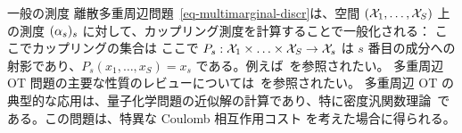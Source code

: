 \begin{rem2}{一般の測度}
離散多重周辺問題~\eqref{eq-multimarginal-discr}は、空間 $(\mathcal{X}_1,\ldots,\mathcal{X}_S)$ 上の測度 $(\alpha_s)_s$ に対して、カップリング測度を計算することで一般化される：
ここでカップリングの集合は
ここで $P_s : \mathcal{X}_1 \times \ldots \times \mathcal{X}_S \rightarrow \mathcal{X}_s$ は $s$ 番目の成分への射影であり、$P_s(x_1,\ldots,x_S)=x_s$ である。例えば~\citep{GangboSciech}を参照されたい。
多重周辺 OT 問題の主要な性質のレビューについては~\citep{PassMultiReview,PassMultiMarginalStructure}を参照されたい。
多重周辺 OT の典型的な応用は、量子化学問題の近似解の計算であり、特に密度汎関数理論~\citep{CotarDFT,GorSeiVig,BuDePGor}である。この問題は、特異な Coulomb 相互作用コスト
を考えた場合に得られる。
\end{rem2}



